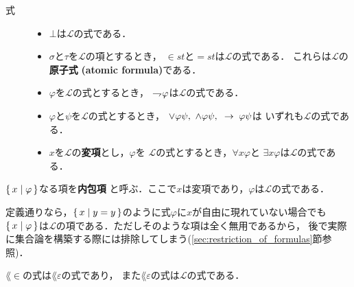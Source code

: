 	\begin{description}
		\item[式] 
			\begin{itemize}
				\item $\bot$は$\mathcal{L}$の式である．
				\item $\sigma$と$\tau$を$\mathcal{L}$の項とするとき，
					$\in st$と$=st$は$\mathcal{L}$の式である．
					これらは$\mathcal{L}$の{\bf 原子式}
					{\bf (atomic formula)}である．
				\item $\varphi$を$\mathcal{L}$の式とするとき，
					$\rightharpoondown\hspace{-0.25em} \varphi$は$\mathcal{L}$の式である．
				\item $\varphi$と$\psi$を$\mathcal{L}$の式とするとき，
					$\vee \varphi \psi,\ \wedge \varphi \psi,\ \rarrow \varphi \psi$は
					いずれも$\mathcal{L}$の式である．
				\item $x$を$\mathcal{L}$の{\bf 変項}とし，$\varphi$を
					$\mathcal{L}$の式とするとき，$\forall x \varphi$と
					$\exists x \varphi$は$\mathcal{L}$の式である．
			\end{itemize}
	\end{description}
	
	\begin{screen}
		\begin{dfn}[内包項]
			$\{\, x \mid \varphi\, \}$なる項を{\bf 内包項}
			と呼ぶ．ここで$x$は変項であり，$\varphi$は$\mathcal{L}$の式である．
		\end{dfn}
	\end{screen}
	
	定義通りなら，$\{\, x \mid y=y\, \}$のように式$\varphi$に$x$が自由に現れていない場合でも
	$\{\, x \mid \varphi\, \}$は$\mathcal{L}$の項である．ただしそのような項は全く無用であるから，
	後で実際に集合論を構築する際には排除してしまう(\ref{sec:restriction_of_formulas}節参照)．
	
	\begin{screen}
		\begin{metathm}
			$\lang{\in}$の式は$\lang{\varepsilon}$の式であり，
			また$\lang{\varepsilon}$の式は$\mathcal{L}$の式である．
		\end{metathm}
	\end{screen}
	

